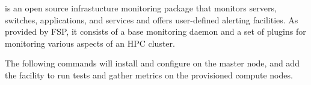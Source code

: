 \Nagios{} is an open source infrastucture monitoring package that monitors
servers, switches, applications, and services and offers user-defined
alerting facilities. As provided by FSP, it consists of a base monitoring 
daemon and a set of plugins for monitoring various aspects of an HPC cluster.

The following commands will install and configure \Nagios{} on the master node, 
and add the facility to run tests and gather metrics on the provisioned compute nodes.
